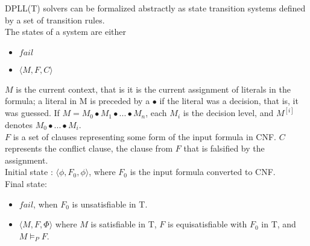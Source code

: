 \documentclass{article}
\begin{document}
DPLL(T) solvers can be formalized abstractly as 
state transition systems defined by a set of transition rules.\\
The states of a system are either
\begin{itemize}
	\item $fail$
	\item $\langle M, F, C \rangle$
\end{itemize}
$M$ is the current context, that is it is the current 
assignment of literals in the formula; a literal in M is 
preceded by a $\bullet$ if the literal was a decision, 
that is, it was guessed. 
If $M = M_0 \bullet M_1 \bullet ... \bullet M_n$, 
each $M_i$ is the decision level, and $M^{[i]}$ 
denotes $M_0 \bullet ... \bullet M_i$. \\
$F$ is a set of clauses representing some form of
the input formula in CNF. $C$ represents the conflict clause,
the clause from $F$ that is falsified by the assignment. \\
Initial state : $\langle \phi, F_0, \phi \rangle$, where $F_0$
is the input formula converted to CNF. \\
Final state:
\begin{itemize}
	\item $fail$, when $F_0$ is unsatisfiable in T.
	\item $\langle M, F, \Phi \rangle$ where $M$ is satisfiable in
	T, $F$ is equisatisfiable with $F_0$ in T, and $M \models_P F$.
\end{itemize}
\end{document}

